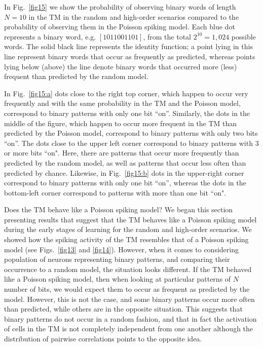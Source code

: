 \documentclass[11pt,letterpaper]{article}
\begin{document}
            In Fig.~\ref{fig15} we show the probability of observing binary words of length $N = 10$
            in the TM in the random and high-order scenarios compared to the probability of observing 
            them in the Poisson spiking model.
            Each blue dot represents a binary word, e.g. $[1 0 1 1 0 0 1 1 0 1]$, from the total 
            $2^{10} = 1,024$ possible words.
            The solid black line represents the identity function; a point lying in this line represent
            binary words that occur as frequently as predicted, whereas points lying below (above) the line
            denote binary words that occurred more (less) frequent than predicted by the random model.
            
            In Fig.~\ref{fig15:a} dots close to the right top corner, which happen to occur very frequently
            and with the same probability in the TM and the Poisson model, correspond to binary patterns
            with only one bit ``on''.
            Similarly, the dots in the middle of the figure, which happen to occur more frequent in
            the TM than predicted by the Poisson model, correspond to binary patterns with only two
            bits ``on''.
            The dots close to the upper left corner correspond to binary patterns with $3$ or more
            bits ``on".
            Here, there are patterns that occur more frequently than predicted by the random model,
            as well as patterns that occur less often than predicted by chance.
            Likewise, in Fig.~\ref{fig15:b} dots in the upper-right corner correspond to binary patterns
            with only one bit ``on'', whereas the dots in the bottom-left corner correspond to patterns
            with more than one bit ``on".
            
            Does the TM behave like a Poisson spiking model?
            We began this section presenting results that suggest that the TM behaves like a Poisson spiking
            model during the early stages of learning for the random and high-order scenarios.
            We showed how the spiking activity of the TM resembles that of a Poisson spiking model 
            (see Figs.~\ref{fig13} and \ref{fig14}).
            However, when it comes to considering population of neurons representing binary patterns, 
            and comparing their occurrence to a random model, the situation looks different.
            If the TM behaved like a Poisson spiking model, then when looking at particular
            patterns of $N$ number of bits, we would expect them to occur as frequent as 
            predicted by the model.
            However, this is not the case, and some binary patterns occur more often than
            predicted, while others are in the opposite situation.
            This suggests that binary patterns do not occur in a random fashion, and that
            in fact the activation of cells in the TM is not completely independent from
            one another although the distribution of pairwise correlations points to the
            opposite idea.
            
\end{document}

